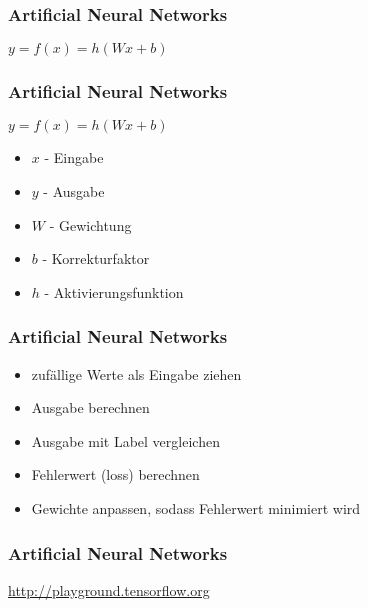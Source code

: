 \documentclass[12pt,utf8]{beamer}
\begin{document}
	\begin{frame}
		\frametitle{Artificial Neural Networks}
		\begin{figure}[h]
			\centering
		\end{figure}
		\centering $y = f(x) = h(Wx + b)$
	\end{frame}
	
	\begin{frame}
		\frametitle{Artificial Neural Networks}
		\begin{center}
			$y = f(x) = h(Wx + b)$
		\end{center}
		\begin{itemize}
			\item $x$ - Eingabe
			\item $y$ - Ausgabe
			\item $W$ - Gewichtung
			\item $b$ - Korrekturfaktor
			\item $h$ - Aktivierungsfunktion
		\end{itemize}
	\end{frame}
	
	\begin{frame}
		\frametitle{Artificial Neural Networks}
		\begin{itemize}
			\item zufällige Werte als Eingabe ziehen
			\item Ausgabe berechnen
			\item Ausgabe mit Label vergleichen
			\item Fehlerwert (loss) berechnen
			\item Gewichte anpassen, sodass Fehlerwert minimiert wird
		\end{itemize}
	\end{frame}
	
	\begin{frame}
		\frametitle{Artificial Neural Networks}
		\centering \url{http://playground.tensorflow.org}
	\end{frame}
	
\end{document}
